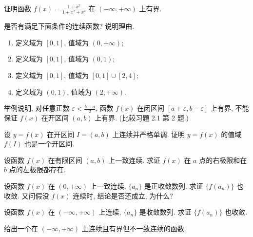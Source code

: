 \begin{exercise}[2.2.9]
    证明函数 $f(x) = \frac{1+x^2}{1+x^2+x^4}$ 在 $(-\infty, +\infty)$ 上有界.
\end{exercise}

\begin{exercise}[2.2.10]
    是否有满足下面条件的连续函数? 说明理由.
    \begin{enumerate}
        \item 定义域为 $[0,1]$, 值域为 $(0, +\infty)$;
        \item 定义域为 $[0,1]$, 值域为 $(0,1)$;
        \item 定义域为 $[0,1]$, 值域为 $[0,1]\cup[2,4]$;
        \item 定义域为 $(0,1)$, 值域为 $(2, +\infty)$.
    \end{enumerate}
\end{exercise}

\begin{exercise}[2.2.11]
    举例说明, 对任意正数 $\varepsilon < \frac{b-a}{2}$, 函数 $f(x)$ 在闭区间 $[a+\varepsilon, b-\varepsilon]$ 上有界, 不能保证 $f(x)$ 在开区间 $(a,b)$ 上有界. (比较习题 2.1 第 2 题.)
\end{exercise}

\begin{exercise}[2.2.12]
    设 $y=f(x)$ 在开区间 $I=(a,b)$ 上连续并严格单调. 证明 $y=f(x)$ 的值域 $f(I)$ 也是一个开区间.
\end{exercise}

\begin{exercise}[2.2.13]
    设函数 $f(x)$ 在有限区间 $(a,b)$ 上一致连续. 求证 $f(x)$ 在 $a$ 点的右极限和在 $b$ 点的左极限都存在.
\end{exercise}

\begin{exercise}[2.2.14]
    设函数 $f(x)$ 在 $(0, +\infty)$ 上一致连续, $\{a_n\}$ 是正收敛数列. 求证 $\{f(a_n)\}$ 也收敛. 又问假没 $f(x)$ 连续时, 结论是否还成立, 为什么?
\end{exercise}

\begin{exercise}[2.2.15]
    设函数 $f(x)$ 在 $(-\infty, +\infty)$ 上连续, $\{a_n\}$ 是收敛数列. 求证 $\{f(a_n)\}$ 也收敛.
\end{exercise}

\begin{exercise}[2.2.16]
    给出一个在 $(-\infty, +\infty)$ 上连续且有界但不一致连续的函数.
\end{exercise}

\newpage
